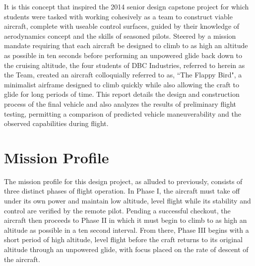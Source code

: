 \documentclass[titlepage]{article}
\begin{document}
It is this concept that inspired the 2014 senior design capstone project for which students were tasked with working cohesively as a team to construct viable aircraft, complete with useable control surfaces, guided by their knowledge of aerodynamics concept and the skills of seasoned pilots. Steered by a mission mandate requiring that each aircraft be designed to climb to as high an altitude as possible in ten seconds before performing an unpowered glide back down to the cruising altitude, the four students of DBC Industries, referred to herein as the Team, created an aircraft colloquially referred to as, ``The Flappy Bird", a minimalist airframe designed to climb quickly while also allowing the craft to glide for long periods of time. This report details the design and construction process of the final vehicle and also analyzes the results of preliminary flight testing, permitting a comparison of predicted vehicle maneuverability and the observed capabilities during flight.

\section{Mission Profile}
The mission profile for this design project, as alluded to previously, consists of three distinct phases of flight operation. In Phase I, the aircraft must take off under its own power and maintain low altitude, level flight while its stability and control are verified by the remote pilot. Pending a successful checkout, the aircraft then proceeds to Phase II in which it must begin to climb to as high an altitude as possible in a ten second interval. From there, Phase III begins with a short period of high altitude, level flight before the craft returns to its original altitude through an unpowered glide, with focus placed on the rate of descent of the aircraft. 
\end{document}
